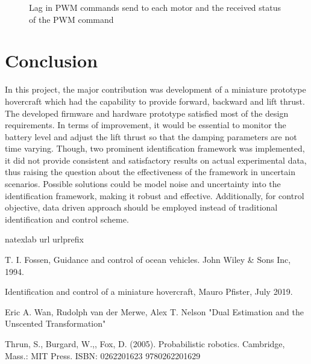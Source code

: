 \documentclass[12pt,titlepage]{article}
\begin{document}
\begin{figure}[H]
\begin{subfigure}{0.49\textwidth}
	\end{subfigure}
    \caption{Lag in PWM commands send to each motor and the received status of the PWM command}
\label{fig:networkLag}
\end{figure}


\section{Conclusion}
In this project, the major contribution was development of a miniature prototype hovercraft which had the capability to provide forward, backward and lift thrust. The developed firmware and hardware prototype satisfied most of the design requirements. In terms of improvement, it would be essential to monitor the battery level and adjust the lift thrust so that the damping parameters are not time varying. Though, two prominent identification framework was implemented, it did not provide consistent and satisfactory results on actual experimental data, thus raising the question about the effectiveness of the framework in uncertain scenarios. Possible solutions could be model noise and uncertainty into the identification framework, making it robust and effective. Additionally, for control objective, data driven approach should be employed instead of traditional identification and control scheme.
\newline


\begin{thebibliography}{33}
	\expandafter\ifx\csname natexlab\endcsname\relax\def\natexlab#1{#1}\fi
	\expandafter\ifx\csname url\endcsname\relax
	\def\url#1{\texttt{#1}}\fi
	\expandafter\ifx\csname urlprefix\endcsname\relax\def\urlprefix{URL }\fi


    T. I. Fossen, Guidance and control of ocean vehicles. John Wiley & Sons Inc, 1994.

    Identification and control of a miniature hovercraft, Mauro Pfister, July 2019.

    Eric A. Wan, Rudolph van der Merwe, Alex T. Nelson "Dual Estimation and the Unscented Transformation"
    
    Thrun, S., Burgard, W.,, Fox, D. (2005). Probabilistic robotics. Cambridge, Mass.: MIT Press. ISBN: 0262201623 9780262201629 
		
\end{thebibliography}
\end{document}
